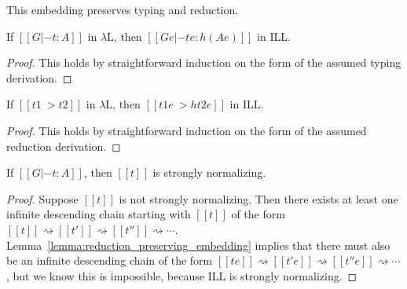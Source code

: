 \documentclass{llncs}
\newcommand{\redto}{\rightsquigarrow}
\begin{document}
\noindent
This embedding preserves typing and reduction.
\begin{lemma}
  \label{lemma:type_preserving_embedding}
  If $[[G |- t : A]]$ in $\lambda\text{L}$, then
  $[[G e |- t e : h(A e)]]$ in ILL.
\end{lemma}
\begin{proof}
  This holds by straightforward induction on the form of the assumed
  typing derivation.
\end{proof}
\begin{lemma}
  \label{lemma:reduction_preserving_embedding}
  If $[[t1 ~> t2]]$ in $\lambda\text{L}$, then $[[t1 e ~> h{t2 e}]]$
  in ILL.
\end{lemma}
\begin{proof}
  This holds by straightforward induction on the form of the assumed
  reduction derivation.
\end{proof}


\begin{theorem}
  \label{corollary:strong_normalization}
  If $[[G |- t : A]]$, then $[[t]]$ is strongly normalizing.
\end{theorem}


\begin{proof}
  Suppose $[[t]]$ is not strongly normalizing.  Then there exists at
  least one infinite descending chain starting with $[[t]]$ of the
  form $[[t]] \redto [[t']] \redto [[t'']] \redto
  \cdots$. Lemma~\ref{lemma:reduction_preserving_embedding} implies
  that there must also be an infinite descending chain of the form
  $[[t e]] \redto [[t' e]] \redto [[t'' e]] \redto \cdots$, but we
  know this is impossible, because ILL is strongly normalizing.
\end{proof}
\end{document}

